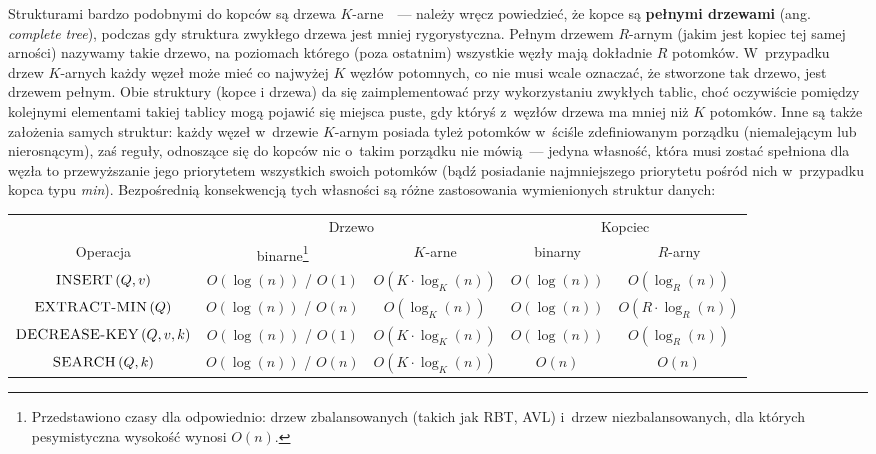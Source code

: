 Strukturami bardzo podobnymi do kopców są drzewa $K$-arne~\cite[$3.1$]{TaDS}~--- należy wręcz powiedzieć, że kopce są \textbf{pełnymi drzewami} (ang. \textit{complete tree}), podczas gdy struktura zwykłego drzewa jest mniej rygorystyczna. Pełnym drzewem $R$-arnym (jakim jest kopiec tej samej arności) nazywamy takie drzewo, na poziomach którego (poza ostatnim) wszystkie węzły mają dokładnie $R$ potomków. W~przypadku drzew $K$-arnych każdy węzeł może mieć co najwyżej $K$ węzłów potomnych, co nie musi wcale oznaczać, że stworzone tak drzewo, jest drzewem pełnym. Obie struktury (kopce i drzewa) da się zaimplementować przy wykorzystaniu zwykłych tablic, choć oczywiście pomiędzy kolejnymi elementami takiej tablicy mogą pojawić się miejsca puste, gdy któryś z~węzłów drzewa ma mniej niż $K$ potomków. Inne są także założenia samych struktur: każdy węzeł w~drzewie $K$-arnym posiada tyleż potomków w~ściśle zdefiniowanym porządku (niemalejącym lub nierosnącym), zaś reguły, odnoszące się do kopców nic o~takim porządku nie mówią~--- jedyna własność, która musi zostać spełniona dla węzła to przewyższanie jego priorytetem wszystkich swoich potomków (bądź posiadanie najmniejszego priorytetu pośród nich w~przypadku kopca typu \textit{min}). Bezpośrednią konsekwencją tych własności są różne zastosowania wymienionych struktur danych: 

\begin{center}
	\begin{savenotes}
		\begin{tabular}{ccccc}
			& \multicolumn{2}{c}{Drzewo} & \multicolumn{2}{c}{Kopciec} \\
			\cline{2-5}
			Operacja & binarne\footnote{Przedstawiono czasy dla odpowiednio: drzew zbalansowanych (takich jak RBT, AVL) i~drzew niezbalansowanych, dla których pesymistyczna wysokość wynosi $O \left( n\right)$.} & $K$-arne & binarny & $R$-arny \\
			\hline
			$\textrm{\textsc{INSERT}} \left( Q, v \right)$ & $ O \left( \log \left( n \right) \right)$ / $ O \left( 1 \right) $ & $O \left( K \cdot \log_{K} \left( n \right) \right)$ & $O \left( \log \left( n \right) \right)$ & $O \left( \log_{R} \left( n \right) \right)$ \\
			$\textrm{\textsc{EXTRACT-MIN}} \left( Q \right)$ & $ O \left( \log \left( n \right) \right)$  / $ O \left( n \right) $ & $ O \left( \log_{K} \left( n\right) \right)$ & $O \left( \log \left( n \right) \right)$ & $O \left( R \cdot \log_{R} \left( n \right) \right)$ \\
			$\textrm{\textsc{DECREASE-KEY}} \left( Q, v, k \right)$ & $ O \left( \log \left( n \right) \right)$  / $ O \left( 1 \right) $ & $O \left( K \cdot \log_{K} \left( n \right) \right)$ & $O \left( \log \left( n \right) \right)$ & $O \left( \log_{R} \left( n \right) \right)$  \\
			$\textrm{\textsc{SEARCH}} \left( Q, k \right)$ & $ O \left( \log \left( n \right) \right)$ / $ O \left( n \right) $ & $O \left( K \cdot \log_{K} \left( n \right) \right)$ & $O \left( n \right)$ & $ O \left( n \right) $  \\
			\hline
		\end{tabular}
	\end{savenotes}
\end{center}

